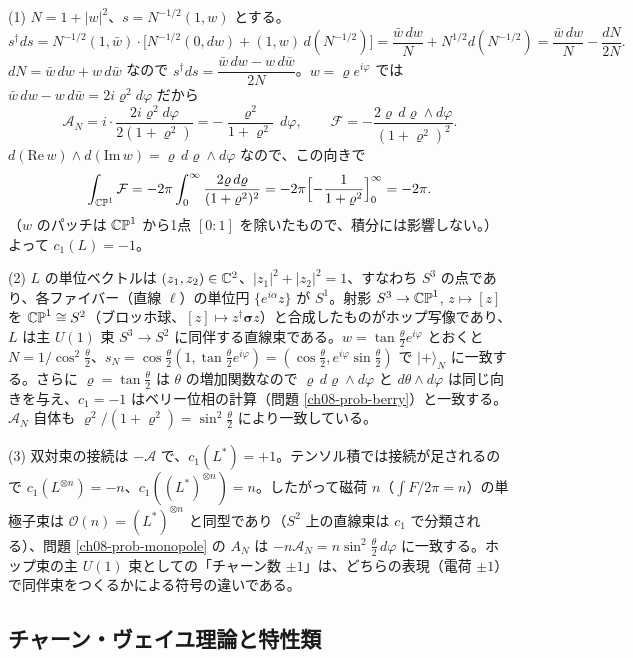 \begin{solution}
(1) $N=1+\lvert w\rvert^2$、$s=N^{-1/2}(1,w)$ とする。
\[
s^\dagger ds=N^{-1/2}(1,\bar w)\cdot\bigl[N^{-1/2}(0,dw)+(1,w)\,d(N^{-1/2})\bigr]=\frac{\bar w\,dw}{N}+N^{1/2}d(N^{-1/2})=\frac{\bar w\,dw}{N}-\frac{dN}{2N}.
\]
$dN=\bar w\,dw+w\,d\bar w$ なので $s^\dagger ds=\dfrac{\bar w\,dw-w\,d\bar w}{2N}$。$w=\varrho e^{i\varphi}$ では $\bar w\,dw-w\,d\bar w=2i\varrho^2d\varphi$ だから
\[
\mathcal A_N=i\cdot\frac{2i\varrho^2d\varphi}{2(1+\varrho^2)}=-\frac{\varrho^2}{1+\varrho^2}\,d\varphi,\qquad\mathcal F=-\frac{2\varrho\,d\varrho\wedge d\varphi}{(1+\varrho^2)^2}.
\]
$d(\mathrm{Re}\,w)\wedge d(\mathrm{Im}\,w)=\varrho\,d\varrho\wedge d\varphi$ なので、この向きで
\[
\int_{\mathbb{CP}^1}\mathcal F=-2\pi\int_0^\infty\frac{2\varrho\,d\varrho}{(1+\varrho^2)^2}=-2\pi\Bigl[-\frac{1}{1+\varrho^2}\Bigr]_0^\infty=-2\pi .
\]
（$w$ のパッチは $\mathbb{CP}^1$ から1点 $[0:1]$ を除いたもので、積分には影響しない。）よって $c_1(L)=-1$。

(2) $L$ の単位ベクトルは $(z_1,z_2)\in\mathbb{C}^2$、$\lvert z_1\rvert^2+\lvert z_2\rvert^2=1$、すなわち $S^3$ の点であり、各ファイバー（直線 $\ell$）の単位円 $\{e^{i\alpha}z\}$ が $S^1$。射影 $S^3\to\mathbb{CP}^1$, $z\mapsto[z]$ を $\mathbb{CP}^1\cong S^2$（ブロッホ球、$[z]\mapsto z^\dagger\bm\sigma z$）と合成したものがホップ写像であり、$L$ は主 $U(1)$ 束 $S^3\to S^2$ に同伴する直線束である。$w=\tan\frac\theta2e^{i\varphi}$ とおくと $N=1/\cos^2\frac\theta2$、$s_N=\cos\frac\theta2(1,\tan\frac\theta2e^{i\varphi})=(\cos\frac\theta2,e^{i\varphi}\sin\frac\theta2)$ で $\lvert+\rangle_N$ に一致する。さらに $\varrho=\tan\frac\theta2$ は $\theta$ の増加関数なので $\varrho\,d\varrho\wedge d\varphi$ と $d\theta\wedge d\varphi$ は同じ向きを与え、$c_1=-1$ はベリー位相の計算（問題 \ref{ch08-prob-berry}）と一致する。$\mathcal A_N$ 自体も $\varrho^2/(1+\varrho^2)=\sin^2\frac\theta2$ により一致している。

(3) 双対束の接続は $-\mathcal A$ で、$c_1(L^*)=+1$。テンソル積では接続が足されるので $c_1(L^{\otimes n})=-n$、$c_1((L^*)^{\otimes n})=n$。したがって磁荷 $n$（$\int F/2\pi=n$）の単極子束は $\mathcal O(n)=(L^*)^{\otimes n}$ と同型であり（$S^2$ 上の直線束は $c_1$ で分類される）、問題 \ref{ch08-prob-monopole} の $A_N$ は $-n\mathcal A_N=n\sin^2\frac\theta2\,d\varphi$ に一致する。ホップ束の主 $U(1)$ 束としての「チャーン数 $\pm1$」は、どちらの表現（電荷 $\pm1$）で同伴束をつくるかによる符号の違いである。
\end{solution}

\subsection{チャーン・ヴェイユ理論と特性類}

